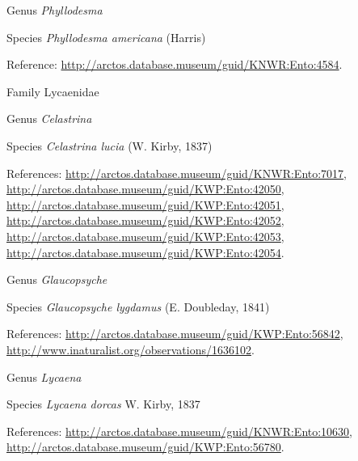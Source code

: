 \documentclass[9pt, article]{memoir}
\begin{document}
\begin{multicols}{2}
\vspace{6pt}\noindent\hspace{30pt}Genus \textit{Phyllodesma}


\vspace{6pt}\noindent\hspace{36pt}Species \textit{Phyllodesma americana} (Harris)


\vspace{6pt}Reference: 
\url{http://arctos.database.museum/guid/KNWR:Ento:4584}.

\vspace{6pt}\noindent\hspace{24pt}Family Lycaenidae


\vspace{6pt}\noindent\hspace{30pt}Genus \textit{Celastrina}


\vspace{6pt}\noindent\hspace{36pt}Species \textit{Celastrina lucia} (W. Kirby, 1837)


\vspace{6pt}References: 
\url{http://arctos.database.museum/guid/KNWR:Ento:7017}, 
\url{http://arctos.database.museum/guid/KWP:Ento:42050}, 
\url{http://arctos.database.museum/guid/KWP:Ento:42051}, 
\url{http://arctos.database.museum/guid/KWP:Ento:42052}, 
\url{http://arctos.database.museum/guid/KWP:Ento:42053}, 
\url{http://arctos.database.museum/guid/KWP:Ento:42054}.

\vspace{6pt}\noindent\hspace{30pt}Genus \textit{Glaucopsyche}


\vspace{6pt}\noindent\hspace{36pt}Species \textit{Glaucopsyche lygdamus} (E. Doubleday, 1841)


\vspace{6pt}References: 
\url{http://arctos.database.museum/guid/KWP:Ento:56842}, 
\url{http://www.inaturalist.org/observations/1636102}.

\vspace{6pt}\noindent\hspace{30pt}Genus \textit{Lycaena}


\vspace{6pt}\noindent\hspace{36pt}Species \textit{Lycaena dorcas} W. Kirby, 1837


\vspace{6pt}References: 
\url{http://arctos.database.museum/guid/KNWR:Ento:10630}, 
\url{http://arctos.database.museum/guid/KWP:Ento:56780}.


\end{multicols}
\end{document}
